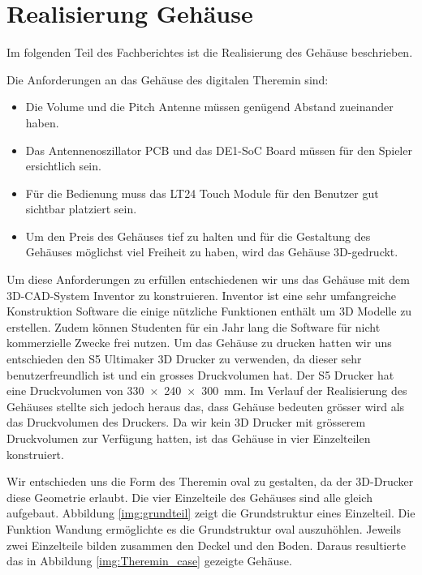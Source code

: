 \clearpage
\section{Realisierung Gehäuse}\label{sec:Realisierung Gehäuse}
Im folgenden Teil des Fachberichtes ist die Realisierung des Gehäuse beschrieben. 

Die Anforderungen an das Gehäuse des digitalen Theremin sind:
\begin{itemize}
	\item Die Volume und die Pitch Antenne müssen genügend Abstand zueinander haben.
	\item Das Antennenoszillator PCB und das DE1-SoC Board müssen für den Spieler ersichtlich sein.
	\item Für die Bedienung muss das LT24 Touch Module für den Benutzer gut sichtbar platziert sein.
	\item Um den Preis des Gehäuses tief zu halten und für die Gestaltung des Gehäuses möglichst viel Freiheit zu haben, wird das Gehäuse 3D-gedruckt.  
\end{itemize}

Um diese Anforderungen zu erfüllen entschiedenen wir uns das Gehäuse mit dem 3D-CAD-System Inventor zu konstruieren. Inventor ist eine sehr umfangreiche Konstruktion Software die einige nützliche Funktionen enthält um 3D Modelle zu erstellen. Zudem können Studenten für ein Jahr lang die Software für nicht kommerzielle Zwecke frei nutzen\cite{Inventor}.
Um das Gehäuse zu drucken hatten wir uns entschieden den S5 Ultimaker 3D Drucker zu verwenden, da dieser sehr benutzerfreundlich ist und ein grosses Druckvolumen hat. 
Der S5 Drucker hat eine Druckvolumen von \SI{330x240x300}{mm}. 
Im Verlauf der Realisierung des Gehäuses stellte sich jedoch heraus das, dass Gehäuse bedeuten grösser wird als das Druckvolumen des Druckers. Da wir kein 3D Drucker mit grösserem Druckvolumen zur Verfügung hatten, ist das Gehäuse in vier Einzelteilen konstruiert. 

Wir entschieden uns die Form des Theremin oval zu gestalten, da der 3D-Drucker diese Geometrie erlaubt. Die vier Einzelteile des Gehäuses sind alle gleich aufgebaut. Abbildung \ref{img:grundteil} zeigt die Grundstruktur eines Einzelteil. Die Funktion Wandung ermöglichte es die Grundstruktur oval auszuhöhlen. Jeweils zwei Einzelteile bilden zusammen den Deckel und den Boden. Daraus resultierte das in Abbildung \ref{img:Theremin_case} gezeigte Gehäuse. 

